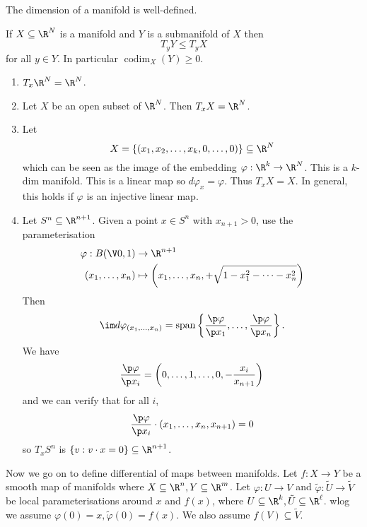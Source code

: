 \documentclass[a4paper]{article}
\DeclareMathOperator{\codim}{codim}
\begin{document}
\begin{corollary}
  The dimension of a manifold is well-defined.
\end{corollary}

\begin{ex}
  If \(X \subseteq \R^N\) is a manifold and \(Y\) is a submanifold of \(X\) then
  \[
    T_yY \leq T_yX
  \]
  for all \(y \in Y\). In particular \(\codim_X(Y) \geq 0\).
\end{ex}

\begin{eg}\leavevmode
  \begin{enumerate}
  \item \(T_x\R^N = \R^N\).
  \item Let \(X\) be an open subset of \(\R^N\). Then \(T_xX = \R^N\).
  \item Let
    \[
      X = \{(x_1, x_2, \dots, x_k, 0, \dots, 0)\} \subseteq \R^N
    \]
    which can be seen as the image of the embedding \(\varphi: \R^k \to \R^N\). This is a \(k\)-dim manifold. This is a linear map so \(d\varphi_x = \varphi\). Thus \(T_xX = X\). In general, this holds if \(\varphi\) is an injective linear map.
  \item Let \(S^n \subseteq \R^{n + 1}\). Given a point \(x \in S^n\) with \(x_{n + 1} > 0\), use the parameterisation
    \begin{align*}
      \varphi: B(\V 0, 1) &\to \R^{n + 1} \\
      (x_1, \dots, x_n) &\mapsto \left(x_1, \dots, x_n, + \sqrt{1 - x_1^2 - \dots - x_n^2}\right)
    \end{align*}
    Then
    \[
      \im d\varphi_{(x_1, \dots, x_n)} = \text{span}\left\{\frac{\p \varphi}{\p x_1}, \dots, \frac{\p \varphi}{\p x_n}\right\}.
    \]
    We have
    \[
      \frac{\p \varphi}{\p x_i} = \left(0, \dots, 1, \dots, 0, -\frac{x_i}{x_{n + 1}}\right)
    \]
    and we can verify that for all \(i\),
    \[
      \frac{\p \varphi}{\p x_i} \cdot (x_1, \dots, x_n, x_{n + 1}) = 0
    \]
    so \(T_xS^n\) is \(\{v: v \cdot x = 0\} \subseteq \R^{n + 1}\).
  \end{enumerate}
\end{eg}

Now we go on to define differential of maps between manifolds. Let \(f: X \to Y\) be a smooth map of manifolds where \(X \subseteq \R^n, Y \subseteq \R^m\). Let \(\varphi:U \to V\) and \(\tilde \varphi: \tilde U \to \tilde V\) be local parameterisations around \(x\) and \(f(x)\), where \(U \subseteq \R^k, \tilde U \subseteq \R^\ell\). wlog we assume \(\varphi(0) = x, \tilde \varphi(0) = f(x)\). We also assume \(f(V) \subseteq \tilde V\).
\end{document}
